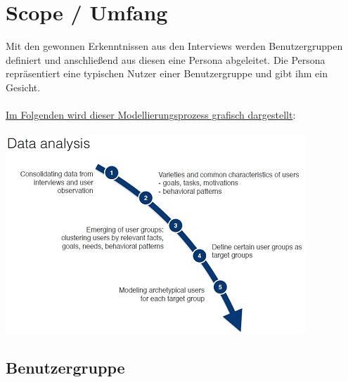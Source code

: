 \documentclass{article}
\begin{document}
\newpage

\section{Scope / Umfang}

Mit den gewonnen Erkenntnissen aus den Interviews werden Benutzergruppen definiert und anschließend aus diesen eine Persona abgeleitet. Die Persona repräsentiert eine typischen Nutzer einer Benutzergruppe und gibt ihm ein Gesicht.\\
\\
\underline{Im Folgenden wird dieser Modellierungsprozess grafisch dargestellt}:\\
\\
\includegraphics{methodik_interview_persona.jpg}

\subsection{Benutzergruppe}
\end{document}
